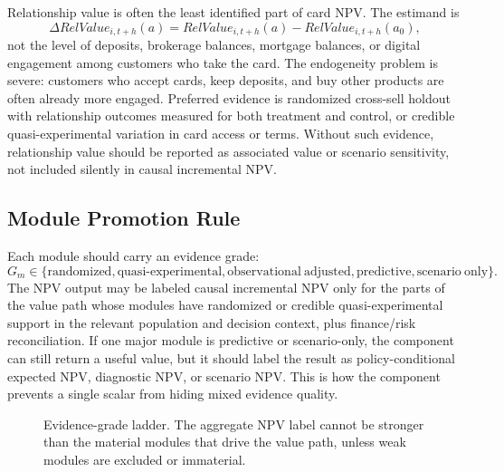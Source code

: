 \documentclass[11pt]{article}
\newcommand{\1}{\mathbf{1}}
\begin{document}
Relationship value is often the least identified part of card NPV. The
estimand is
\[
  \Delta RelValue_{i,t+h}(a)
  =
  RelValue_{i,t+h}(a)-RelValue_{i,t+h}(a_0),
\]
not the level of deposits, brokerage balances, mortgage balances, or digital
engagement among customers who take the card. The endogeneity problem is
severe: customers who accept cards, keep deposits, and buy other products are
often already more engaged. Preferred evidence is randomized cross-sell
holdout with relationship outcomes measured for both treatment and control, or
credible quasi-experimental variation in card access or terms. Without such
evidence, relationship value should be reported as associated value or
scenario sensitivity, not included silently in causal incremental NPV.

\subsection*{Module Promotion Rule}

Each module should carry an evidence grade:
\[
  G_m\in
  \{\mathrm{randomized},\mathrm{quasi\text{-}experimental},
    \mathrm{observational\ adjusted},\mathrm{predictive},
    \mathrm{scenario\ only}\}.
\]
The NPV output may be labeled causal incremental NPV only for the parts of the
value path whose modules have randomized or credible quasi-experimental
support in the relevant population and decision context, plus finance/risk
reconciliation. If one major module is predictive or scenario-only, the
component can still return a useful value, but it should label the result as
policy-conditional expected NPV, diagnostic NPV, or scenario NPV. This is how
the component prevents a single scalar from hiding mixed evidence quality.

\begin{figure}[t]
\centering
{}
\caption{Evidence-grade ladder. The aggregate NPV label cannot be stronger than
the material modules that drive the value path, unless weak modules are
excluded or immaterial.}
\label{fig:evidence-grade-ladder}
\end{figure}
\end{document}
